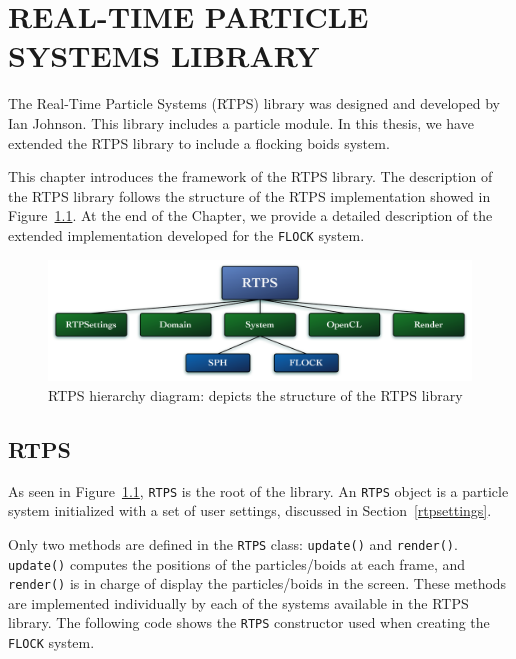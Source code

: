 \chapter{REAL-TIME PARTICLE SYSTEMS LIBRARY}\label{RTPSchapter}

The Real-Time Particle Systems (RTPS) library was designed and developed by Ian Johnson\cite{ianPaper}. This library includes a particle module. In this thesis, we have extended the RTPS library to include a flocking boids system. 

This chapter introduces the framework of the RTPS library. The description of the RTPS library follows the structure of the RTPS implementation showed in Figure~\ref{RTPSdiagram}. At the end of the Chapter, we provide a detailed description of the extended implementation developed for the \texttt{FLOCK} system.

\begin{figure}[htbp]
\begin{center}
\includegraphics[scale=0.38]{figures/RTPSdiagramMyrna.pdf}
\caption{RTPS hierarchy diagram: depicts the structure of the RTPS library}
\label{RTPSdiagram}
\end{center}
\end{figure}

\section{RTPS}\label{rtpssection}
As seen in Figure~\ref{RTPSdiagram}, \texttt{RTPS} is the root of the library. An \texttt{RTPS} object is a particle system initialized with a set of user settings,  discussed in Section~\ref{rtpsettings}. 

Only two methods are defined in the \texttt{RTPS} class: \texttt{update()} and \texttt{render()}. \texttt{update()} computes the positions of the particles/boids at each frame, and \texttt{render()} is in charge of display the particles/boids in the screen. These methods are implemented individually by each of the systems available in the RTPS library. The following code shows the \texttt{RTPS} constructor used when creating the \texttt{FLOCK} system.

